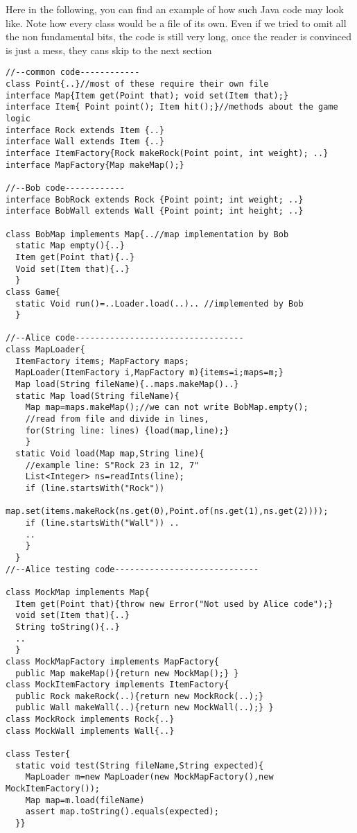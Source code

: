 \documentclass[submission,copyright,creativecommons]{eptcs}
\begin{document}
Here in the following, you can find an example of how such Java code may look like.
Note how every class would be a file of its own.
Even if we tried to omit all the non fundamental bits,
the code is still very long, once the reader is convinced is just a mess, they
cans skip to the next section
\begin{lstlisting}
//--common code------------
class Point{..}//most of these require their own file
interface Map{Item get(Point that); void set(Item that);}
interface Item{ Point point(); Item hit();}//methods about the game logic
interface Rock extends Item {..}
interface Wall extends Item {..}
interface ItemFactory{Rock makeRock(Point point, int weight); ..}
interface MapFactory{Map makeMap();}

//--Bob code------------
interface BobRock extends Rock {Point point; int weight; ..}
interface BobWall extends Wall {Point point; int height; ..}

class BobMap implements Map{..//map implementation by Bob
  static Map empty(){..}
  Item get(Point that){..}
  Void set(Item that){..}
  }
class Game{
  static Void run()=..Loader.load(..).. //implemented by Bob
  }

//--Alice code----------------------------------
class MapLoader{
  ItemFactory items; MapFactory maps;
  MapLoader(ItemFactory i,MapFactory m){items=i;maps=m;}
  Map load(String fileName){..maps.makeMap()..}
  static Map load(String fileName){
    Map map=maps.makeMap();//we can not write BobMap.empty();
    //read from file and divide in lines,
    for(String line: lines) {load(map,line);}
    }
  static Void load(Map map,String line){
    //example line: S"Rock 23 in 12, 7"
    List<Integer> ns=readInts(line);
    if (line.startsWith("Rock"))
      map.set(items.makeRock(ns.get(0),Point.of(ns.get(1),ns.get(2))));
    if (line.startsWith("Wall")) ..
    ..
    }
  }
//--Alice testing code-----------------------------
  
class MockMap implements Map{
  Item get(Point that){throw new Error("Not used by Alice code");}
  void set(Item that){..}
  String toString(){..}
  ..
  }
class MockMapFactory implements MapFactory{
  public Map makeMap(){return new MockMap();} }
class MockItemFactory implements ItemFactory{
  public Rock makeRock(..){return new MockRock(..);}
  public Wall makeWall(..){return new MockWall(..);} }
class MockRock implements Rock{..}
class MockWall implements Wall{..}

class Tester{
  static void test(String fileName,String expected){
    MapLoader m=new MapLoader(new MockMapFactory(),new MockItemFactory());
    Map map=m.load(fileName)
    assert map.toString().equals(expected);
  }}
\end{lstlisting}
\end{document}
